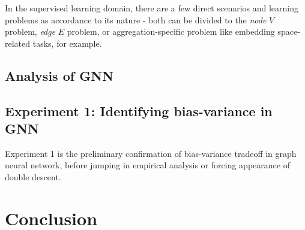 In the supervised learning domain, there are a few direct scenarios and learning problems as accordance to its nature - both can be divided to the \textit{node} $V$ problem, \textit{edge} $E$ problem, or aggregation-specific problem like embedding space-related tasks, for example. 

\subsection{Analysis of GNN}



\subsection{Experiment 1: Identifying bias-variance in GNN}
Experiment 1 is the preliminary confirmation of bias-variance tradeoff in graph neural network, before jumping in empirical analysis or forcing appearance of double descent. 



\clearpage
\section{Conclusion}


